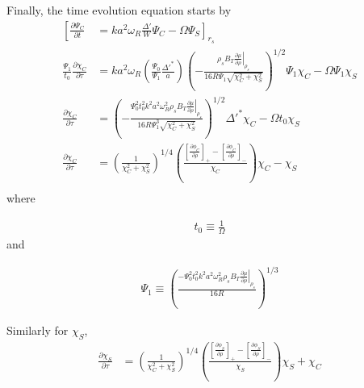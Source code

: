 \documentclass{article}
\begin{document}
Finally, the time evolution equation starts by
\begin{equation} \label{wessonCurrentProfile}
\begin{split}
\left [  \frac{\partial \Psi_C}{\partial t}\right. & = \left. k a^2 \omega_R \frac{\Delta '}{W}\Psi_C - \Omega \Psi_S \right]_{r_s}\\
\frac{\Psi_1}{t_0}\frac{\partial \chi_C}{\partial \tau} & = k a^2 \omega_R \left(  \frac{\Psi_0}{\Psi_1}\frac{\Delta'^{*} }{a} \right)    \left( - \frac{\rho_s B_T \left.\frac{\partial \mu}{\partial \rho}\right|_{\rho_s}}{16 R \Psi_1 \sqrt{\chi_C^2+\chi_S^2} }\right)^{1/2}      \Psi_1 \chi_C - \Omega \Psi_1 \chi_S\\
\frac{\partial \chi_C}{\partial \tau} & =     \left( - \frac{\Psi_0^2 t_0^2 k^2 a^2 \omega_R^2 \rho_s B_T \left.\frac{\partial \mu}{\partial \rho}\right|_{\rho_s}}{16 R \Psi_1^3 \sqrt{\chi_C^2+\chi_S^2} }\right)^{1/2}  \Delta'^{*}    \chi_C - \Omega t_0 \chi_S\\
\frac{\partial \chi_C}{\partial \tau} & =     \left(  \frac{1}{\chi_C^2+\chi_S^2} \right)^{1/4}       \left(\frac{ \left[\frac{\partial \phi_C}{\partial \rho}\right]_{+}-\left[\frac{\partial \phi_C}{\partial \rho}\right]_{-}}{\chi_C}\right)      \chi_C - \chi_S\\
\end{split} 
\end{equation} 
where

\begin{equation} \label{wessonCurrentProfile}
\begin{split}
t_0 \equiv \frac{1}{\Omega}
\end{split} 
\end{equation} 
and

\begin{equation} \label{wessonCurrentProfile}
\begin{split}
\Psi_1 \equiv  \left( \frac{-\Psi_0^2 t_0^2 k^2 a^2 \omega_R^2 \rho_s B_T \left.\frac{\partial \mu}{\partial \rho}\right|_{\rho_s}}{16R} \right ) ^{1/3}
\end{split} 
\end{equation}

Similarly for $\chi_S$, 
\begin{equation} \label{wessonCurrentProfile}
\begin{split}
\frac{\partial \chi_S}{\partial \tau} & =     \left(  \frac{1}{\chi_C^2+\chi_S^2} \right)^{1/4}  \left(\frac{ \left[\frac{\partial \phi_S}{\partial \rho}\right]_{+}-\left[\frac{\partial \phi_S}{\partial \rho}\right]_{-}}{\chi_S}\right)  \chi_S + \chi_C\\
\end{split} 
\end{equation}  
\end{document}
